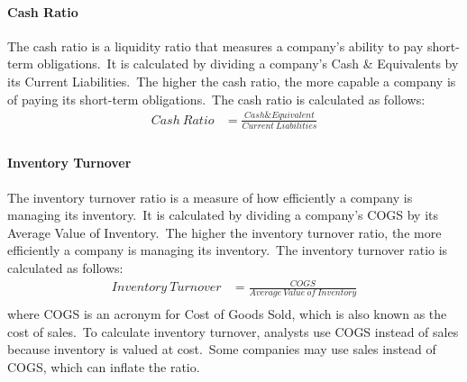 \documentclass[../xlapes02]{subfiles}
\begin{document}
    \paragraph{Cash Ratio}\label{par:cash-ratio}
    The cash ratio is a liquidity ratio that measures a company's ability to pay short-term obligations.\ It is calculated by dividing a company's Cash \& Equivalents by its Current Liabilities.\ The higher the cash ratio, the more capable a company is of paying its short-term obligations.\ The cash ratio is calculated as follows:
    \begin{equation}
        \label{eq:cash-ratio}
        \begin{split}
            Cash\ Ratio&=\frac{Cash\&Equivalent}{Current\ Liabilities}\\
        \end{split}
    \end{equation}

    \paragraph{Inventory Turnover}\label{par:inventory-turnover}
    The inventory turnover ratio is a measure of how efficiently a company is managing its inventory.\ It is calculated by dividing a company's COGS by its Average Value of Inventory.\ The higher the inventory turnover ratio, the more efficiently a company is managing its inventory.\ The inventory turnover ratio is calculated as follows:
    \begin{equation}
        \label{eq:inventory-turnover}
        \begin{split}
            Inventory\ Turnover&=\frac{COGS}{Average\ Value\ of\ Inventory}\\
        \end{split}
    \end{equation}
    where COGS is an acronym for Cost of Goods Sold, which is also known as the cost of sales.\ To calculate inventory turnover, analysts use COGS instead of sales because inventory is valued at cost.\ Some companies may use sales instead of COGS, which can inflate the ratio.
\end{document}
